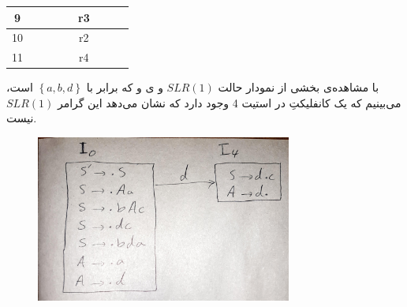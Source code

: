 \documentclass{article}
\begin{document}
\begin{latin}
\begin{table}[H]
\begin{tabular}{|ccccccccc|}
\multicolumn{1}{|c|}{{\color[HTML]{0000FF} 9}}         & \multicolumn{1}{c|}{}           & \multicolumn{1}{c|}{}           & \multicolumn{1}{c|}{}           & \multicolumn{1}{c|}{}           & \multicolumn{1}{c|}{r3}                         & \multicolumn{1}{c|}{}            & \multicolumn{1}{c|}{}                         &                          \\ \hline
\multicolumn{1}{|c|}{{\color[HTML]{0000FF} 10}}        & \multicolumn{1}{c|}{}           & \multicolumn{1}{c|}{}           & \multicolumn{1}{c|}{}           & \multicolumn{1}{c|}{}           & \multicolumn{1}{c|}{r2}                         & \multicolumn{1}{c|}{}            & \multicolumn{1}{c|}{}                         &                          \\ \hline
\multicolumn{1}{|c|}{{\color[HTML]{0000FF} 11}}        & \multicolumn{1}{c|}{}           & \multicolumn{1}{c|}{}           & \multicolumn{1}{c|}{}           & \multicolumn{1}{c|}{}           & \multicolumn{1}{c|}{r4}                         & \multicolumn{1}{c|}{}            & \multicolumn{1}{c|}{}                         &                          \\ \hline
\end{tabular}
\end{table}
\end{latin}

با مشاهده‌ی بخشی از نمودار حالت $SLR(1)$ و ی  و  که برابر با $\left\{ a, b, d \right\}$ است، می‌بینیم که یک کانفلیکتِ  در استیت 4 وجود دارد که نشان می‌دهد این گرامر $SLR(1)$ نیست.
\begin{figure}[H]
    \centering
    \includegraphics[width=0.75\textwidth]{figures/9a.jpg}
    \caption
	{}
    \label{fig:fig1}
\end{figure}
\end{document}
